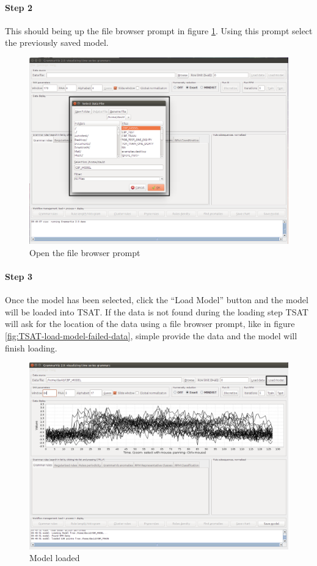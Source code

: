 \documentclass[letterpaper, 12pt]{article}
\begin{document}
\newpage
\paragraph{Step 2}
This should being up the file browser prompt in figure \ref{fig:TSAT-load-model-step-2}. Using this prompt select the previously saved model.

\begin{figure}[H]
	\includegraphics[width=\textwidth]{TSAT-load-model-step-2}
	\caption{Open the file browser prompt}
	\label{fig:TSAT-load-model-step-2}
\end{figure}

\newpage
\paragraph{Step 3}
Once the model has been selected, click the ``Load Model'' button and the model will be loaded into TSAT. If the data is not found during the loading step TSAT will ask for the location of the data using a file browser prompt, like in figure \ref{fig:TSAT-load-model-failed-data}, simple provide the data and the model will finish loading. 

\begin{figure}[H]
	\includegraphics[width=\textwidth]{TSAT-load-model-step-3}
	\caption{Model loaded}
	\label{fig:TSAT-load-model-step-3}
\end{figure}
\end{document}
